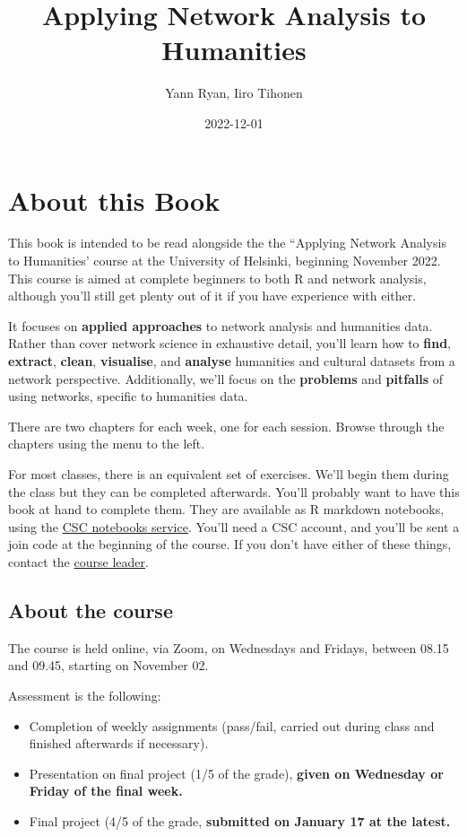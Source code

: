 \documentclass[
]{book}
\title{Applying Network Analysis to Humanities}
\author{Yann Ryan, Iiro Tihonen}
\date{2022-12-01}
\begin{document}
\maketitle

{
\setcounter{tocdepth}{1}
\tableofcontents
}
\hypertarget{about-this-book}{%
\chapter{About this Book}\label{about-this-book}}

This book is intended to be read alongside the the ``Applying Network
Analysis to Humanities' course at the University of Helsinki, beginning
November 2022. This course is aimed at complete beginners to both R and
network analysis, although you'll still get plenty out of it if you have
experience with either.

It focuses on \textbf{applied approaches} to network analysis and humanities
data. Rather than cover network science in exhaustive detail, you'll
learn how to \textbf{find}, \textbf{extract}, \textbf{clean}, \textbf{visualise}, and
\textbf{analyse} humanities and cultural datasets from a network perspective.
Additionally, we'll focus on the \textbf{problems} and \textbf{pitfalls} of using
networks, specific to humanities data.

There are two chapters for each week, one for each session. Browse
through the chapters using the menu to the left.

For most classes, there is an equivalent set of exercises. We'll begin
them during the class but they can be completed afterwards. You'll
probably want to have this book at hand to complete them. They are
available as R markdown notebooks, using the \href{https://notebooks.rahtiapp.fi/welcome}{CSC notebooks
service}. You'll need a CSC
account, and you'll be sent a join code at the beginning of the course.
If you don't have either of these things, contact the \href{mailto:yann.ryan@helinki.fi}{course
leader}.

\hypertarget{about-the-course}{%
\section{About the course}\label{about-the-course}}

The course is held online, via Zoom, on Wednesdays and Fridays, between
08.15 and 09.45, starting on November 02.

Assessment is the following:

\begin{itemize}
\item
  Completion of weekly assignments (pass/fail, carried out during
  class and finished afterwards if necessary).
\item
  Presentation on final project (1/5 of the grade), \textbf{given on
  Wednesday or Friday of the final week.}
\item
  Final project (4/5 of the grade, \textbf{submitted on January 17 at the
  latest.}
\end{itemize}
\end{document}
